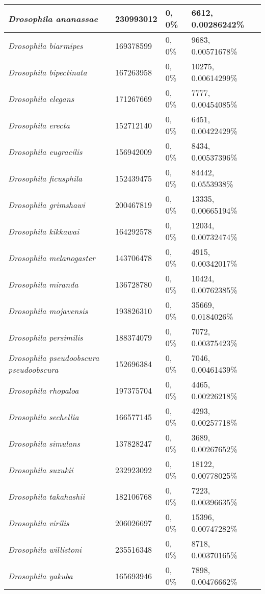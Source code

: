 {\begin{longtable}{| L{4cm} | L{2.7cm}  | L{3.7cm} | L{3.7cm} |}
\textit{Drosophila ananassae} & 230993012 & 0, 0\% & 6612, 0.00286242\% \\ \hline
\textit{Drosophila biarmipes} & 169378599 & 0, 0\% & 9683, 0.00571678\% \\ \hline
\textit{Drosophila bipectinata} & 167263958 & 0, 0\% & 10275, 0.00614299\% \\ \hline
\textit{Drosophila elegans} & 171267669 & 0, 0\% & 7777, 0.00454085\% \\ \hline
\textit{Drosophila erecta} & 152712140 & 0, 0\% & 6451, 0.00422429\% \\ \hline
\textit{Drosophila eugracilis} & 156942009 & 0, 0\% & 8434, 0.00537396\% \\ \hline
\textit{Drosophila ficusphila} & 152439475 & 0, 0\% & 84442, 0.0553938\% \\ \hline
\textit{Drosophila grimshawi} & 200467819 & 0, 0\% & 13335, 0.00665194\% \\ \hline
\textit{Drosophila kikkawai} & 164292578 & 0, 0\% & 12034, 0.00732474\% \\ \hline
\textit{Drosophila melanogaster} & 143706478 & 0, 0\% & 4915, 0.00342017\% \\ \hline
\textit{Drosophila miranda} & 136728780 & 0, 0\% & 10424, 0.00762385\% \\ \hline
\textit{Drosophila mojavensis} & 193826310 & 0, 0\% & 35669, 0.0184026\% \\ \hline
\textit{Drosophila persimilis} & 188374079 & 0, 0\% & 7072, 0.00375423\% \\ \hline
\textit{Drosophila pseudoobscura pseudoobscura} & 152696384 & 0, 0\% & 7046, 0.00461439\% \\ \hline
\textit{Drosophila rhopaloa} & 197375704 & 0, 0\% & 4465, 0.00226218\% \\ \hline
\textit{Drosophila sechellia} & 166577145 & 0, 0\% & 4293, 0.00257718\% \\ \hline
\textit{Drosophila simulans} & 137828247 & 0, 0\% & 3689, 0.00267652\% \\ \hline
\textit{Drosophila suzukii} & 232923092 & 0, 0\% & 18122, 0.00778025\% \\ \hline
\textit{Drosophila takahashii} & 182106768 & 0, 0\% & 7223, 0.00396635\% \\ \hline
\textit{Drosophila virilis} & 206026697 & 0, 0\% & 15396, 0.00747282\% \\ \hline
\textit{Drosophila willistoni} & 235516348 & 0, 0\% & 8718, 0.00370165\% \\ \hline
\textit{Drosophila yakuba} & 165693946 & 0, 0\% & 7898, 0.00476662\% \\ \hline

\end{longtable}}
